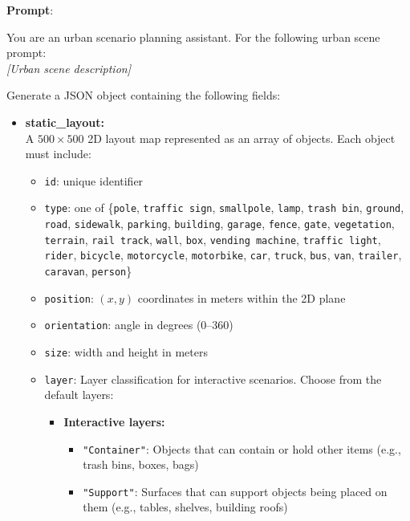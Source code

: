 \documentclass{article}
\begin{document}
\begin{tcolorbox}[examplebox, title=Scene Specification Format]

\textbf{Prompt}:

You are an urban scenario planning assistant. For the following urban scene prompt:\\

\emph{[Urban scene description]}

\vspace{1em}
\noindent Generate a JSON object containing the following fields:
\begin{itemize}
    \item \textbf{static\_layout:} \\
    A $500 \times 500$ 2D layout map represented as an array of objects. Each object must include:
    \begin{itemize}
        \item \texttt{id}: unique identifier
        \item \texttt{type}: one of \{\texttt{pole}, \texttt{traffic sign}, \texttt{smallpole}, \texttt{lamp}, \texttt{trash bin}, \texttt{ground}, \texttt{road}, \texttt{sidewalk}, \texttt{parking}, \texttt{building}, \texttt{garage}, \texttt{fence}, \texttt{gate}, \texttt{vegetation}, \texttt{terrain}, \texttt{rail track}, \texttt{wall}, \texttt{box}, \texttt{vending machine}, \texttt{traffic light}, \texttt{rider}, \texttt{bicycle}, \texttt{motorcycle}, \texttt{motorbike}, \texttt{car}, \texttt{truck}, \texttt{bus}, \texttt{van}, \texttt{trailer}, \texttt{caravan}, \texttt{person}\}
        \item \texttt{position}: $(x, y)$ coordinates in meters within the 2D plane
        \item \texttt{orientation}: angle in degrees (0--360)
        \item \texttt{size}: width and height in meters
        \item \texttt{layer}: Layer classification for interactive scenarios. Choose from the default layers: 
        \begin{itemize}
            \item \textbf{Interactive layers:} 
            \begin{itemize}
                \item \texttt{"Container"}: Objects that can contain or hold other items (e.g., trash bins, boxes, bags)
                \item \texttt{"Support"}: Surfaces that can support objects being placed on them (e.g., tables, shelves, building roofs)

\end{itemize}
\end{itemize}
\end{itemize}
\end{itemize}
\end{tcolorbox}
\end{document}
